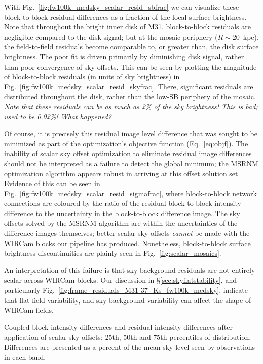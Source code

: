 \documentclass[iop]{emulateapj}
\newcommand{\comment}[1]{\textcolor{OliveGreen}{\textit{#1}}} %
\newcommand{\Fig}[1]{Fig.~\ref{fig:#1}}  %
\newcommand{\Eq}[1]{Eq.~\ref{eq:#1}}  %
\newcommand{\Sec}[1]{\S\ref{sec:#1}}  %
\begin{document}
With \Fig{fw100k_medsky_scalar_resid_sbfrac} we can visualize these block-to-block residual differences as a fraction of the local surface brightness.
Note that throughout the bright inner disk of M31, block-to-block residuals are negligible compared to the disk signal; but at the mosaic periphery ($R\sim 20$~kpc), the field-to-field residuals become comparable to, or greater than, the disk surface brightness.
The poor fit is driven primarily by diminishing disk signal, rather than poor convergence of sky offsets.
This can be seen by plotting the magnitude of block-to-block residuals (in units of sky brightness) in \Fig{fw100k_medsky_scalar_resid_skyfrac}.
There, significant residuals are distributed throughout the disk, rather than the low-SB periphery of the mosaic.
\comment{Note that these residuals can be as much as 2\% of the sky brightness! This is bad; used to be 0.02\%! What happened?}

Of course, it is precisely this residual image level difference that was sought to be minimized as part of the optimization's objective function (\Eq{objf}).
The inability of scalar sky offset optimization to eliminate residual image differences should not be interpreted as a failure to detect the global minimum; the MSRNM optimization algorithm appears robust in arriving at this offset solution set.
Evidence of this can be seen in \Fig{fw100k_medsky_scalar_resid_sigmafrac}, where block-to-block network connections are coloured by the ratio of the residual block-to-block intensity difference to the uncertainty in the block-to-block difference image.
The sky offsets solved by the MSRNM algorithm are within the uncertainties of the difference images themselves; better scalar sky offsets \emph{cannot} be made with the WIRCam blocks our pipeline has produced.
Nonetheless, block-to-block surface brightness discontinuities are plainly seen in \Fig{scalar_mosaics}.

An interpretation of this failure is that sky background residuals are not entirely scalar across WIRCam blocks.
Our discussion in \Sec{skyflatstability}, and particularly \Fig{frame_residuals_M31-37_Ks_fw100k_medsky}, indicate that flat field variability, and sky background variability can affect the shape of WIRCam fields.

\begin{table}[t]
\centering
\caption[Coupled block differences and residual differences after
scalar sky offsets]{Coupled block intensity differences and residual intensity differences after application of scalar sky offsets: 25th, 50th and 75th percentiles of distribution.
Differences are presented as a percent of the mean sky level seen by observations in each band.
}

\label{tab:fw100k_medsky_scalar_resid_diffs}
\end{table}
\end{document}
